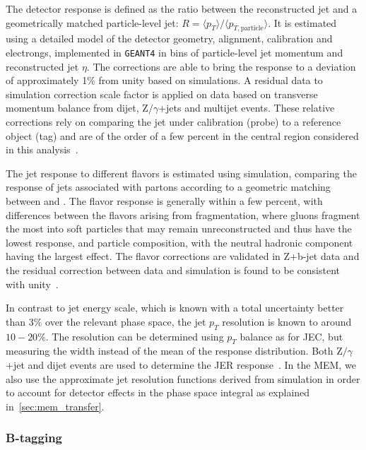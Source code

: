 The detector response is defined as the ratio between the reconstructed jet and a geometrically matched particle-level jet: $R = \langle p_T \rangle / \langle p_{T,\mathrm{particle}} \rangle$. It is estimated using a detailed model of the detector geometry, alignment, calibration and electrongs, implemented in \texttt{GEANT4} in bins of particle-level jet momentum and reconstructed jet $\eta$. The corrections are able to bring the response to a deviation of approximately 1\% from unity based on simulations. A residual data to simulation correction scale factor is applied on data based on transverse momentum balance from dijet, $\mathrm{Z}/\gamma$+jets and multijet events. These relative corrections rely on comparing the jet under calibration (probe) to a reference object (tag) and are of the order of a few percent in the central region considered in this analysis~\cite{Chatrchyan:2011ds,cms_jec_2017}.

The jet response to different flavors is estimated using simulation, comparing the response of jets associated with partons according to a geometric matching between \pythia and \herwig. The flavor response is generally within a few percent, with differences between the flavors arising from fragmentation, where gluons fragment the most into soft particles that may remain unreconstructed and thus have the lowest response, and particle composition, with the neutral hadronic component having the largest effect. The flavor corrections are validated in Z+b-jet data and the residual correction between data and simulation is found to be consistent with unity~\cite{Chatrchyan:2011ds}.

In contrast to jet energy scale, which is known with a total uncertainty better than $3\%$ over the relevant phase space, the jet $p_T$ resolution is known to around $10-20\%$. The resolution can be determined using $p_T$ balance as for JEC, but measuring the width instead of the mean of the response distribution. Both $\mathrm{Z}/\gamma$+jet and dijet events are used to determine the JER response~\cite{Chatrchyan:2011ds}. In the MEM, we also use the approximate jet resolution functions derived from simulation in order to account for detector effects in the phase space integral as explained in~\cref{sec:mem_transfer}.

\subsubsection{B-tagging}
\label{sec:object_id_btag}

